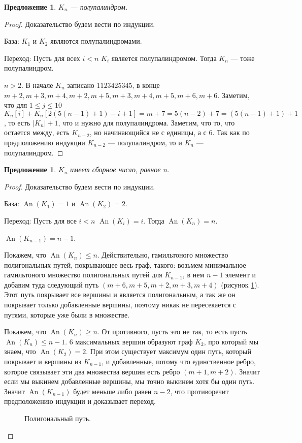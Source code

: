 \documentclass[a4paper,fleqn,12pt,top=0pt]{article}
\theoremstyle{plain}
\newtheorem{proposition}[theorem]{Предложение}
\theoremstyle{definition}
\theoremstyle{remark}
\newcommand{\An}{\operatorname{An}}
\begin{document}
\begin{proposition}\label{k_sp}
    $K_n$ --- полупалиндром.
\end{proposition}
\begin{proof}
    Доказательство будем вести по индукции.

    База: $K_1$ и $K_2$ являются полупалиндромами.
    
    Переход: Пусть для всех $i < n$ $K_i$ является полупалиндромом. Тогда $K_n$ --- тоже полупалиндром. 

    $n > 2$. В начале $K_n$ записано $1123425345$, в конце $m + 2, m + 3, m + 4, m + 2, m + 5, m + 3, m + 4, m + 5, m + 6, m + 6$. Заметим, что для $1 \le j \le 10$ $K_n[i] + K_n[2(5(n - 1) + 1) - i + 1] = m + 7 = 5(n - 2) + 7 = (5(n - 1) + 1) + 1$, то есть $|K_n| + 1$, что и нужно для полупалиндрома. Заметим, что то, что остается между, есть $K_{n - 2}$, но начинающийся не с единицы, а с $6$. Так как по предположению индукции $K_{n - 2}$ --- полупалиндром, то и $K_n$ --- полупалиндром.
\end{proof}

\begin{proposition}\label{k_an}
    $K_n$ имеет сборное число, равное $n$.
\end{proposition}
\begin{proof}
    Доказательство будем вести по индукции.

    База: $\An(K_1) = 1$ и $\An(K_2) = 2$.

    Переход: Пусть для все $i < n$ $\An(K_i) = i$. Тогда $\An(K_n) = n$.

    $\An(K_{n - 1}) = n - 1$. 
    
    Покажем, что $\An(K_{n}) \le n$. Действительно, гамильтоного множество полигональных путей, покрывающее весь граф, такого: возьмем минимальное гамильтоного множество полигональных путей для $K_{n - 1}$, в нем $n - 1$ элемент и добавим туда следующий путь $(m + 6, m + 5, m + 2, m + 3, m + 4)$ (рисунок \ref{path_for_proof}). Этот путь покрывает все вершины и является полигональным, а так же он покрывает только добавленные вершины, поэтому никак не пересекается с путями, которые уже были в множестве.

    Покажем, что $\An(K_{n}) \ge n$. От противного, пусть это не так, то есть пусть $\An(K_{n}) \le n - 1$. 6 максимальных вершин образуют граф $K_2$, про который мы знаем, что $\An(K_2) = 2$. При этом существует максимум один путь, который покрывает и вершины из $K_{n - 1}$, и добавленные, потому что единственное ребро, которое связывает эти два множества вершин есть ребро $(m + 1, m + 2)$. Значит если мы выкинем добавленные вершины, мы точно выкинем хотя бы один путь. Значит $\An(K_{n - 1})$ будет меньше либо равен $n - 2$, что противоречит предположению индукции и доказывает переход.

\begin{figure}
    \centering
    
    \caption{Полигональный путь.}
    \label{path_for_proof}
\end{figure}

\end{proof}
\end{document}
